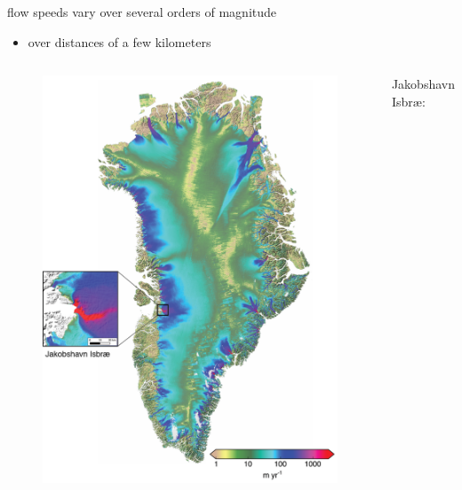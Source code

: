 \documentclass[hide notes,intlimits]{beamer}
\begin{document}
\begin{frame}[plain]
\phantom{foo}
flow speeds vary over several orders of magnitude

\begin{itemize}
\item over distances of a few kilometers
\end{itemize}

\vspace{-5mm}
  \begin{columns}
    \column[c]{5.5cm}
    \begin{figure}
      \includegraphics[width=\textwidth]{greenland-obs-overview}
    \end{figure}
    \column[c]{6cm}
    Jakobshavn Isbr{\ae}:
    

\end{columns}
\end{frame}
\end{document}
